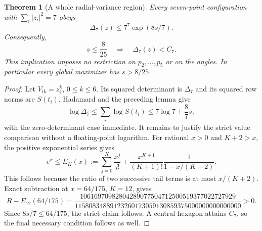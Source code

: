 \documentclass[11pt]{article}
\newtheorem{theorem}{Theorem}[section]
\theoremstyle{remark}
\numberwithin{equation}{section}
\begin{document}
\begin{theorem}[A whole radial-variance region]
\label{thm:noorigin-oct7-nearcircle}
Every seven-point configuration with $\sum_i|z_i|^2=7$ obeys
\begin{equation}\label{eq:noorigin-oct7-variance-bound}
                    \Delta_7(z)\le7^7\exp(8s/7).
\end{equation}
Consequently,
\[
                   s\le\frac8{25}\quad\Longrightarrow\quad
                   \Delta_7(z)<C_7.
\]
This implication imposes no restriction on $p_2,\ldots,p_5$ or on
the angles. In particular every global maximizer has $s>8/25$.
\end{theorem}
\begin{proof}
Let $V_{ik}=z_i^k$, $0\le k\le6$. Its squared determinant is
$\Delta_7$ and its squared row norms are $S(t_i)$. Hadamard and
the preceding lemma give
\[
 \log\Delta_7\le\sum_i\log S(t_i)
             \le7\log7+\frac87s,
\]
with the zero-determinant case immediate. It remains to justify the
strict value comparison without a floating-point logarithm.
For rational $x>0$ and $K+2>x$, the positive exponential series gives
\begin{equation}\label{eq:noorigin-oct7-exp-tail}
 e^x\le E_K(x):=\sum_{j=0}^K\frac{x^j}{j!}
             +\frac{x^{K+1}}{(K+1)!}\frac1{1-x/(K+2)}.
\end{equation}
This follows because the ratio of two successive tail terms is at
most $x/(K+2)$. Exact subtraction at $x=64/175$, $K=12$, gives
\[
 R-E_{12}(64/175)=
 \frac{10616970982804289077504712500519377022727929}
 {11580834889123260173059130859375000000000000000}>0.
\]
Since $8s/7\le64/175$, the strict claim follows. A central hexagon
attains $C_7$, so the final necessary condition follows as well.
\end{proof}
\end{document}
